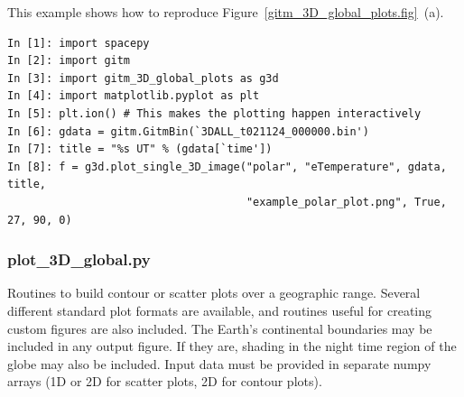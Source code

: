 This example shows how to reproduce Figure~\ref{gitm_3D_global_plots.fig}~(a).

\begin{verbatim}
In [1]: import spacepy
In [2]: import gitm
In [3]: import gitm_3D_global_plots as g3d
In [4]: import matplotlib.pyplot as plt
In [5]: plt.ion() # This makes the plotting happen interactively
In [6]: gdata = gitm.GitmBin(`3DALL_t021124_000000.bin')
In [7]: title = "%s UT" % (gdata[`time'])
In [8]: f = g3d.plot_single_3D_image("polar", "eTemperature", gdata, title, 
                                     "example_polar_plot.png", True, 27, 90, 0)
\end{verbatim}

\subsubsection{plot\_3D\_global.py}

Routines to build contour or scatter plots over a geographic range.  Several different standard plot formats are available, and routines useful for creating custom figures are also included.  The Earth's continental boundaries may be included in any output figure.  If they are, shading in the night time region of the globe may also be included.  Input data must be provided in separate numpy arrays (1D or 2D for scatter plots, 2D for contour plots).

